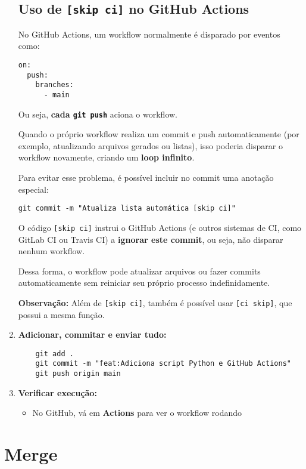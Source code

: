 \begin{enumerate}
    \subsection{Uso de \texttt{[skip ci]} no GitHub Actions}

No GitHub Actions, um workflow normalmente é disparado por eventos como:

\begin{verbatim}
on:
  push:
    branches:
      - main
\end{verbatim}

Ou seja, \textbf{cada \texttt{git push}} aciona o workflow.  

Quando o próprio workflow realiza um commit e push automaticamente (por exemplo, atualizando arquivos gerados ou listas), isso poderia disparar o workflow novamente, criando um \textbf{loop infinito}.  

Para evitar esse problema, é possível incluir no commit uma anotação especial:

\begin{verbatim}
git commit -m "Atualiza lista automática [skip ci]"
\end{verbatim}

O código \texttt{[skip ci]} instrui o GitHub Actions (e outros sistemas de CI, como GitLab CI ou Travis CI) a \textbf{ignorar este commit}, ou seja, não disparar nenhum workflow.  

Dessa forma, o workflow pode atualizar arquivos ou fazer commits automaticamente sem reiniciar seu próprio processo indefinidamente.  

\textbf{Observação:} Além de \texttt{[skip ci]}, também é possível usar \texttt{[ci skip]}, que possui a mesma função.

    \item \textbf{Adicionar, commitar e enviar tudo:}
    \begin{verbatim}
    git add .
    git commit -m "feat:Adiciona script Python e GitHub Actions"
    git push origin main
    \end{verbatim}
    
    \item \textbf{Verificar execução:}
    \begin{itemize}
        \item No GitHub, vá em \textbf{Actions} para ver o workflow rodando
    \end{itemize}
\end{enumerate}

\section{Merge}


